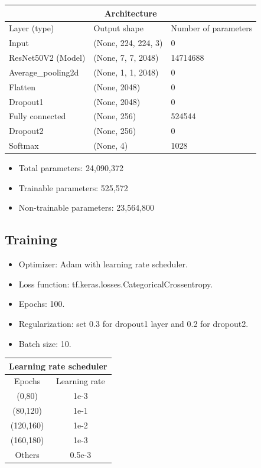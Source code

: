 \documentclass[a4paper,10pt]{article}
\begin{document}
\begin{tabular}{|p{4cm}|p{4cm}|p{4cm}|}
  
  \hline
  \multicolumn{3}{|c|}{Architecture} \\
  \hline
  Layer (type) & Output shape & Number of parameters \\
  \hline
  Input              & (None, 224, 224, 3)& 0 \\
  ResNet50V2 (Model) & (None, 7, 7, 2048)  & 14714688 \\
  Average\_pooling2d  & (None, 1, 1, 2048)  & 0 \\ 
  Flatten            & (None, 2048)      & 0   \\
  Dropout1            & (None, 2048)      & 0   \\
  Fully connected    & (None, 256)        & 524544 \\
  Dropout2           & (None, 256)        & 0 \\
  Softmax            & (None, 4)          & 1028 \\
  \hline
\end{tabular}

\begin{itemize}
  \item Total parameters: 24,090,372
  \item Trainable parameters: 525,572
  \item Non-trainable parameters: 23,564,800
\end{itemize}

\subsection{Training}

\begin{itemize}
  \item Optimizer: Adam with learning rate scheduler.
  \item Loss function: tf.keras.losses.CategoricalCrossentropy.
  \item Epochs: 100.
  \item Regularization: set 0.3 for dropout1 layer and 0.2 for dropout2.
  \item Batch size: 10. 
\end{itemize}

\begin{tabular}{|c|c|}
  
  \hline
  \multicolumn{2}{|c|}{Learning rate scheduler} \\
  \hline
  Epochs              & Learning rate  \\
  \hline
  (0,80)    & 1e-3  \\
  (80,120)  & 1e-1   \\ 
  (120,160) & 1e-2    \\
  (160,180) & 1e-3     \\
  Others    & 0.5e-3    \\
  \hline
\end{tabular}
\end{document}
